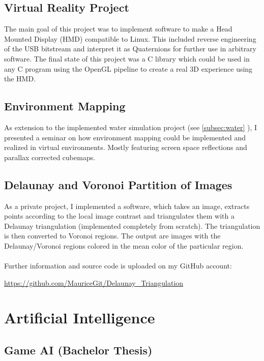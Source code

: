 \documentclass[a4paper, 12pt]{article}
\begin{document}
\subsection{Virtual Reality Project}

The main goal of this project was to implement software to make a Head Mounted Display (HMD) compatible to Linux.
This included reverse engineering of the USB bitstream and interpret it as Quaternions for further use in arbitrary 
software. The final state of this project was a C library which could be used in any C program using the OpenGL
pipeline to create a real 3D experience using the HMD.

\subsection{Environment Mapping}

As extension to the implemented water simulation project (see \ref{subsec:water} \glqq{}\grqq), I
presented a seminar on how environment mapping could be implemented and realized in virtual environments.
Mostly featuring screen space reflections and parallax corrected cubemaps.

\subsection{Delaunay and Voronoi Partition of Images}

As a private project, I implemented a software, which takes an image, extracts points according to the local
image contrast and triangulates them with a Delaunay triangulation (implemented completely from scratch).
The triangulation is then converted to Voronoi regions. The output are images with the Delaunay/Voronoi
regions colored in the mean color of the particular region.
\\
\\
Further information and source code is uploaded on my GitHub account:

\begin{center}
	\url{https://github.com/MauriceGit/Delaunay_Triangulation}
\end{center}

\section{Artificial Intelligence}

\subsection{Game AI (Bachelor Thesis)}\label{subsec:thesis}
\end{document}
